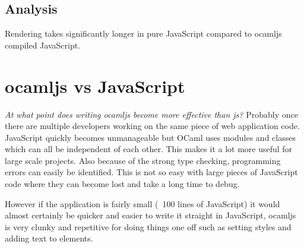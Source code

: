 \subsection{Analysis}
Rendering takes significantly longer in pure JavaScript compared to ocamljs compiled JavaScript.

\section{ocamljs vs JavaScript}
\emph{At what point does writing ocamljs become more effective than js?} Probably once there are multiple developers working on the same piece of web application code. JavaScript quickly becomes unmanageable but OCaml uses modules and classes which can all be independent of each other. This makes it a lot more useful for large scale projects. Also because of the strong type checking, programming errors can easily be identified. This is not so easy with large pieces of JavaScript code where they can become lost and take a long time to debug.

However if the application is fairly small (~100 lines of JavaScript) it would almost certainly be quicker and easier to write it straight in JavaScript, ocamljs is very clunky and repetitive for doing things one off such as setting styles and adding text to elements.





